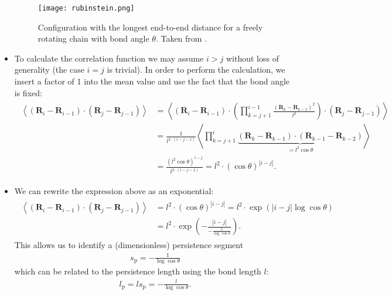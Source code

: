 \documentclass[a4paper,10pt,bibtotoc]{scrartcl}
\begin{document}
\begin{itemize}
\begin{figure}[h]
\centering
\texttt{[image: rubinstein.png]}
\caption{Configuration with the longest end-to-end distance for a freely rotating chain with bond angle $\theta$. Taken from \cite{rubinstein}.}
\label{fig:length}
\end{figure}


\item \noindent To calculate the correlation function we may assume $i>j$ without loss of generality (the case $i=j$ is trivial). In order to perform the calculation, we insert a factor of 1 into the mean value and use the fact that the bond angle is fixed:
\begin{align}
\begin{split}
 \left\langle\left(\mathbf{R}_i-\mathbf{R}_{i-1}\right)\cdot\left(\mathbf{R}_j-\mathbf{R}_{j-1}\right)\right\rangle &= \left\langle\left(\mathbf{R}_i-\mathbf{R}_{i-1}\right)\cdot\left( \prod_{k=j+1}^{i-1}\frac{\left(\mathbf{R}_k-\mathbf{R}_{k-1}\right)^2}{l^2}\right)\cdot\left(\mathbf{R}_j-\mathbf{R}_{j-1}\right)\right\rangle\\
 &= \frac{1}{l^{2\cdot\left(i-j-1\right)}}\left\langle\prod_{k=j+1}^{i}\underbrace{\left(\mathbf{R}_k-\mathbf{R}_{k-1}\right)\cdot\left(\mathbf{R}_{k-1}-\mathbf{R}_{k-2}\right)}_{=l^2\cos\theta}\right\rangle\\
 &= \frac{\left(l^2\cos\theta\right)^{i-j}}{l^{2\cdot\left(i-j-1\right)}} = l^2\cdot\left(\cos\theta\right)^{\left|i-j\right|}.
 \end{split}
\end{align}
\item We can rewrite the expression above as an exponential:
\begin{align}
\begin{split}
\left\langle\left(\mathbf{R}_i-\mathbf{R}_{i-1}\right)\cdot\left(\mathbf{R}_j-\mathbf{R}_{j-1}\right)\right\rangle &= l^2\cdot\left(\cos\theta\right)^{\left|i-j\right|} = l^2\cdot\exp\left(\left|i-j\right|\log\cos\theta\right)\\ &= l^2\cdot\exp\left(-\frac{\left|i-j\right|}{-\frac{1}{\log\cos\theta}}\right).
\end{split}
\end{align}
This allows us to identify a (dimensionless) persistence segment
\begin{align}
 s_\mathrm{p} = -\frac{1}{\log\cos\theta}
\end{align}
which can be related to the persistence length using the bond length $l$:
\begin{align}
l_\mathrm{p} = ls_\mathrm{p} = -\frac{l}{\log\cos\theta}.
\end{align}


\end{itemize}
\end{document}

